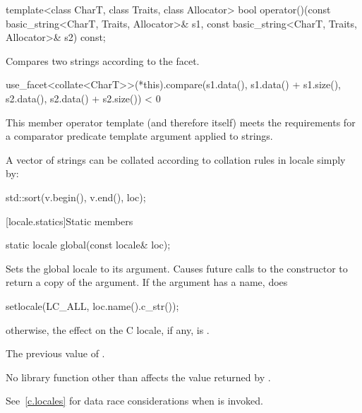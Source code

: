 %
\begin{itemdecl}
template<class CharT, class Traits, class Allocator>
  bool operator()(const basic_string<CharT, Traits, Allocator>& s1,
                  const basic_string<CharT, Traits, Allocator>& s2) const;
\end{itemdecl}

\begin{itemdescr}
\pnum
\effects
Compares two strings according to the  facet.

\pnum
\returns
\begin{codeblock}
use_facet<collate<CharT>>(*this).compare(s1.data(), s1.data() + s1.size(),
                                         s2.data(), s2.data() + s2.size()) < 0
\end{codeblock}

\pnum
\remarks
This member operator template (and therefore  itself)
meets the requirements for
a comparator predicate template argument applied to strings.

\pnum
\begin{example}
A vector of strings 
can be collated according to collation rules in locale 
simply by:

\begin{codeblock}
std::sort(v.begin(), v.end(), loc);
\end{codeblock}
\end{example}
\end{itemdescr}

[locale.statics]{Static members}

%
\begin{itemdecl}
static locale global(const locale& loc);
\end{itemdecl}

\begin{itemdescr}
\pnum
\effects
Sets the global locale to its argument.
Causes future calls to the constructor 
to return a copy of the argument.
If the argument has a name, does
\begin{codeblock}
setlocale(LC_ALL, loc.name().c_str());
\end{codeblock}
otherwise, the effect on the C locale, if any, is
.

\pnum
\returns
The previous value of .

\pnum
\remarks
No library function other than 
affects the value returned by .
\begin{note}
See~\ref{c.locales} for data race considerations
when  is invoked.
\end{note}
\end{itemdescr}


